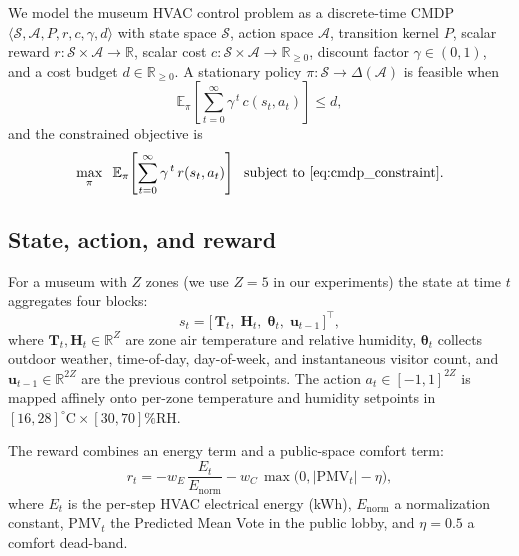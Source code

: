 \documentclass[11pt,a4paper]{article}
\begin{document}
We model the museum HVAC control problem as a discrete-time CMDP
$\langle\mathcal{S},\mathcal{A},P,r,c,\gamma,d\rangle$ with state space
$\mathcal{S}$, action space $\mathcal{A}$, transition kernel $P$, scalar
reward $r:\mathcal{S}\times\mathcal{A}\to\mathbb{R}$, scalar cost
$c:\mathcal{S}\times\mathcal{A}\to\mathbb{R}_{\ge 0}$, discount factor
$\gamma\in(0,1)$, and a cost budget $d\in\mathbb{R}_{\ge 0}$. A
stationary policy $\pi:\mathcal{S}\to\Delta(\mathcal{A})$ is feasible
when
\begin{equation}
\mathbb{E}_{\pi}\!\left[\sum_{t=0}^\infty \gamma^{\,t}\, c(s_t,a_t)\right]
\le d,
\label{eq:cmdp_constraint}
\end{equation}
and the constrained objective is
\begin{equation}
\max_{\pi}\;\;\mathbb{E}_{\pi}\!\left[\sum_{t=0}^\infty \gamma^{\,t}\, r(s_t,a_t)\right]
\;\text{ subject to \eqref{eq:cmdp_constraint}.}
\label{eq:cmdp_objective}
\end{equation}

\subsection{State, action, and reward}\label{sec:state_action_reward}

For a museum with $Z$ zones (we use $Z=5$ in our experiments) the state
at time $t$ aggregates four blocks:
\begin{equation}
s_t = \big[\,\mathbf{T}_t,\;\mathbf{H}_t,\;\boldsymbol{\theta}_t,\;
            \boldsymbol{u}_{t-1}\,\big]^{\top},
\label{eq:state}
\end{equation}
where $\mathbf{T}_t,\mathbf{H}_t\in\mathbb{R}^{Z}$ are zone air
temperature and relative humidity, $\boldsymbol{\theta}_t$ collects
outdoor weather, time-of-day, day-of-week, and instantaneous visitor
count, and $\boldsymbol{u}_{t-1}\in\mathbb{R}^{2Z}$ are the previous
control setpoints. The action $a_t\in[-1,1]^{2Z}$ is mapped affinely
onto per-zone temperature and humidity setpoints in
$[16,28]^\circ\mathrm{C}\times[30,70]\%\mathrm{RH}$.

The reward combines an energy term and a public-space comfort term:
\begin{equation}
r_t = -w_E\,\frac{E_t}{E_{\mathrm{norm}}} - w_C\,\max\big(0,|\mathrm{PMV}_t|-\eta\big),
\label{eq:reward}
\end{equation}
where $E_t$ is the per-step HVAC electrical energy (kWh),
$E_{\mathrm{norm}}$ a normalization constant, $\mathrm{PMV}_t$ the
Predicted Mean Vote in the public lobby, and $\eta=0.5$ a comfort
dead-band.
\end{document}
